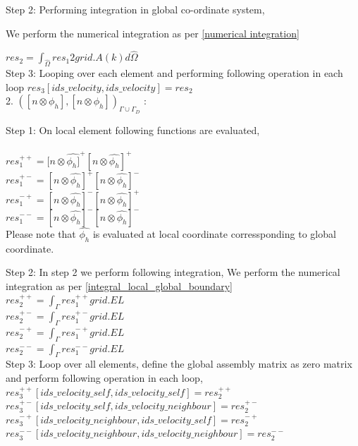 \documentclass[a4paper,12pt]{book}
\begin{document}
Step 2: Performing integration in global co-ordinate system,

We perform the numerical integration as per \ref{numerical integration} 

$res_2 = \int_{\hat{\Omega}} res_1 2 grid.A(k)  d \hat{\Omega}$\\

Step 3: Looping over each element and performing following operation in each loop $res_3[ids\_velocity,ids\_velocity]=res_2$\\


2. $([n \otimes \phi_h], [n \otimes \phi_h])_{\Gamma \cup \Gamma_D}$ :

Step 1: On local element following functions are evaluated,\\
\\
$res_1^{++} = [n \otimes \hat{\phi_h]}^+ [n \otimes \hat{\phi_h}]^+$\\
$res_1^{+-} = [n \otimes \hat{\phi_h}]^+ [n \otimes \hat{\phi_h}]^-$\\
$res_1^{-+} = [n \otimes \hat{\phi_h}]^- [n \otimes \hat{\phi_h}]^+$\\
$res_1^{--} = [n \otimes \hat{\phi_h}]^- [n \otimes \hat{\phi_h}]^-$\\

Please note that $\hat{\phi_h}$ is evaluated at local coordinate corressponding to global coordinate.

Step 2: In step 2 we perform following integration, 
We perform the numerical integration as per \ref{integral_local_global_boundary}
\\ 
$res_2^{++} = \int_{\Gamma} res_1^{++} grid.EL$\\
$res_2^{+-} = \int_{\Gamma} res_1^{+-} grid.EL$\\
$res_2^{-+} = \int_{\Gamma} res_1^{-+} grid.EL$\\
$res_2^{--} = \int_{\Gamma} res_1^{--} grid.EL$\\

Step 3: Loop over all elements, define the global assembly matrix as zero matrix and perform following operation in each loop,
\\
$res_3^{++}[ids\_velocity\_self,ids\_velocity\_self] = res_2^{++}$\\
$res_3^{+-}[ids\_velocity\_self,ids\_velocity\_neighbour] = res_2^{+-}$\\
$res_3^{-+}[ids\_velocity\_neighbour,ids\_velocity\_self] = res_2^{-+}$\\
$res_3^{--}[ids\_velocity\_neighbour,ids\_velocity\_neighbour] = res_2^{--}$\\
\end{document}
